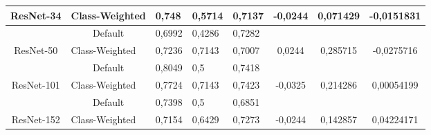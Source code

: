 \begin{table}[hbtp]
\begin{center}
\begin{tabular}{|c|c|lll|ccc|}
		\multirow{-2}{*}{ResNet-34}                          & \multicolumn{1}{l|}{Class-Weighted}                       & \multicolumn{1}{l|}{0,748}   & \multicolumn{1}{l|}{0,5714} & 0,7137                   & \multicolumn{1}{c|}{\multirow{-2}{*}{-0,0244}} & \multicolumn{1}{c|}{\multirow{-2}{*}{0,071429}} & \multirow{-2}{*}{-0,0151831} \\ \hline
															 & Default                                                   & \multicolumn{1}{l|}{0,6992}  & \multicolumn{1}{l|}{0,4286} & 0,7282                   & \multicolumn{1}{c|}{}                          & \multicolumn{1}{c|}{}                           &                              \\ \cline{2-5}
		\multirow{-2}{*}{ResNet-50}                          & \multicolumn{1}{l|}{Class-Weighted}                       & \multicolumn{1}{l|}{0,7236}  & \multicolumn{1}{l|}{0,7143} & 0,7007                   & \multicolumn{1}{c|}{\multirow{-2}{*}{0,0244}}  & \multicolumn{1}{c|}{\multirow{-2}{*}{0,285715}} & \multirow{-2}{*}{-0,0275716} \\ \hline
															 & Default                                                   & \multicolumn{1}{l|}{0,8049}  & \multicolumn{1}{l|}{0,5}    & 0,7418                   & \multicolumn{1}{c|}{}                          & \multicolumn{1}{c|}{}                           &                              \\ \cline{2-5}
		\multirow{-2}{*}{ResNet-101}                         & \multicolumn{1}{l|}{Class-Weighted}                       & \multicolumn{1}{l|}{0,7724}  & \multicolumn{1}{l|}{0,7143} & 0,7423                   & \multicolumn{1}{c|}{\multirow{-2}{*}{-0,0325}} & \multicolumn{1}{c|}{\multirow{-2}{*}{0,214286}} & \multirow{-2}{*}{0,00054199} \\ \hline
															 & Default                                                   & \multicolumn{1}{l|}{0,7398}  & \multicolumn{1}{l|}{0,5}    & 0,6851                   & \multicolumn{1}{c|}{}                          & \multicolumn{1}{c|}{}                           &                              \\ \cline{2-5}
		\multirow{-2}{*}{ResNet-152}                         & \multicolumn{1}{l|}{Class-Weighted}                       & \multicolumn{1}{l|}{0,7154}  & \multicolumn{1}{l|}{0,6429} & 0,7273                   & \multicolumn{1}{c|}{\multirow{-2}{*}{-0,0244}} & \multicolumn{1}{c|}{\multirow{-2}{*}{0,142857}} & \multirow{-2}{*}{0,04224171} \\ \hline
	\end{tabular}
\end{center}
\end{table}

